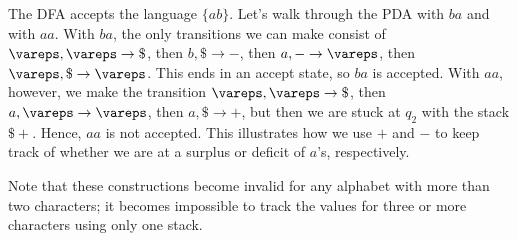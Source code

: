 \documentclass[solution, letterpaper]{cs121}
\begin{document}
\begin{solution}
\begin{center}
\end{center}

The DFA accepts the language $\{ab\}$.  Let's walk through the PDA with $ba$ and with $aa$.  With $ba$, the only transitions we can make consist of $\vareps, \vareps \rightarrow \$$, then $b, \$ \rightarrow -$, then $a, - \rightarrow \vareps$, then $\vareps, \$ \rightarrow \vareps$.  This ends in an accept state, so $ba$ is accepted.  With $aa$, however, we make the transition $\vareps, \vareps \rightarrow \$$, then $a, \vareps \rightarrow \vareps$, then $a, \$ \rightarrow +$, but then we are stuck at $q_2$ with the stack $\$+$.  Hence, $aa$ is not accepted.  This illustrates how we use $+$ and $-$ to keep track of whether we are at a surplus or deficit of $a$'s, respectively.

\indent Note that these constructions become invalid for any alphabet with more than two characters; it becomes impossible to track the values for three or more characters using only one stack.

\end{solution}
\end{document}
